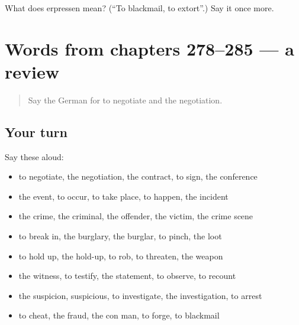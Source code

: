 \begin{tcolorbox}[breakable,colback=teal!4,colframe=teal!35!black,title={Before you move on}]
What does erpressen mean? (\textquotedblleft{}To blackmail, to extort\textquotedblright{}.) Say it once more.
\end{tcolorbox}
\section[(dialogue)]{Words from chapters 278–285 — a review}

\label{lesson:GE-R285-review-278-285}



\begin{quote}
Say the German for to negotiate and the negotiation.
\end{quote}

\subsection*{Your turn}
Say these aloud:

\begin{itemize}
\raggedright
  \item to negotiate, the negotiation, the contract, to sign, the conference
  \item the event, to occur, to take place, to happen, the incident
  \item the crime, the criminal, the offender, the victim, the crime scene
  \item to break in, the burglary, the burglar, to pinch, the loot
  \item to hold up, the hold-up, to rob, to threaten, the weapon
  \item the witness, to testify, the statement, to observe, to recount
  \item the suspicion, suspicious, to investigate, the investigation, to arrest
  \item to cheat, the fraud, the con man, to forge, to blackmail
\end{itemize}

